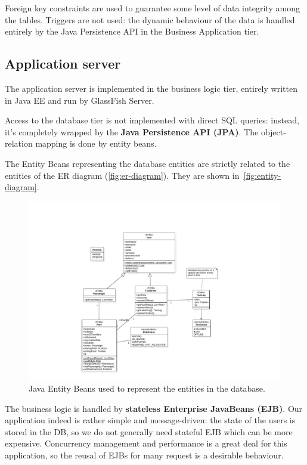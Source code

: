 Foreign key constraints are used to guarantee some level of data integrity among the tables.
Triggers are not used: the dynamic behaviour of the data is handled entirely by the Java Persistence API in the Business Application tier.

\subsection{Application server}
The application server is implemented in the business logic tier, entirely written in Java EE and run by GlassFish Server.

Access to the database tier is not implemented with direct SQL queries: instead, it's completely wrapped by the \textbf{Java Persistence API (JPA)}. The object-relation mapping is done by entity beans.

The Entity Beans representing the database entities are strictly related to the entities of the ER diagram (\autoref{fig:er-diagram}). They are shown in~\autoref{fig:entity-diagram}.

\begin{figure}
    \centering
    \includegraphics[width=\textwidth]{diagrams/entity_diagram}
    \caption{Java Entity Beans used to represent the entities in the database.}
    \label{fig:entity-diagram}
\end{figure}

The business logic is handled by \textbf{stateless Enterprise JavaBeans (EJB)}.
Our application indeed is rather simple and message-driven: the state of the users is stored in the DB, so we do not generally need stateful EJB which can be more expensive.
Concurrency management and performance is a great deal for this application, so the reusal of EJBs for many request is a desirable behaviour.

